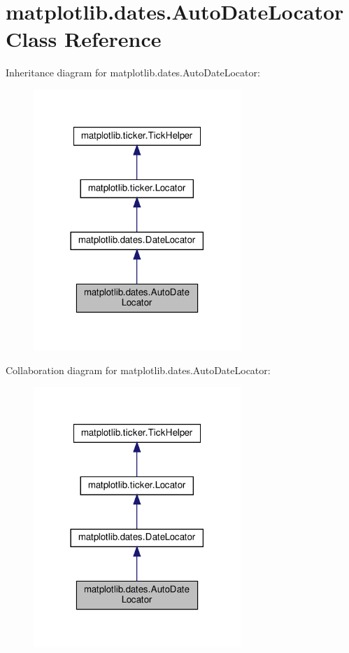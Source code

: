 \hypertarget{classmatplotlib_1_1dates_1_1AutoDateLocator}{}\section{matplotlib.\+dates.\+Auto\+Date\+Locator Class Reference}
\label{classmatplotlib_1_1dates_1_1AutoDateLocator}


Inheritance diagram for matplotlib.\+dates.\+Auto\+Date\+Locator\+:
\nopagebreak
\begin{figure}[H]
\begin{center}
\leavevmode
\includegraphics[width=222pt]{classmatplotlib_1_1dates_1_1AutoDateLocator__inherit__graph}
\end{center}
\end{figure}


Collaboration diagram for matplotlib.\+dates.\+Auto\+Date\+Locator\+:
\nopagebreak
\begin{figure}[H]
\begin{center}
\leavevmode
\includegraphics[width=222pt]{classmatplotlib_1_1dates_1_1AutoDateLocator__coll__graph}
\end{center}
\end{figure}
